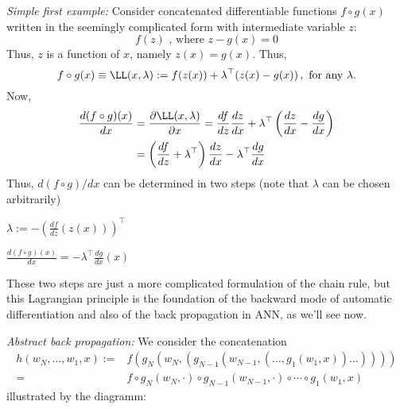 \emph{Simple first example:} Consider concatenated differentiable functions $f\circ g(x)$ written in the seemingly complicated form with intermediate variable $z$:
\[
f(z)\text{ , where }z-g(x)=0 
\]
Thus, $z$ is a function of $x$, namely $z(x)=g(x)$. Thus,
\[
f\circ g(x)\equiv\LL(x,\lambda):= f(z(x))+\lambda^\top(z(x)-g(x))\, ,
\text{ for any }\lambda.
\]
Now,
\begin{align*}
\frac{d(f\circ g)(x)}{dx}&=
\frac{\partial \LL(x,\lambda)}{\partial x}=
\frac{df}{dz}\frac{dz}{dx}+\lambda^\top\left(\frac{dz}{dx}-\frac{dg}{dx}\right)\\
&=\left(\frac{df}{dz}+\lambda^\top\right)\frac{dz}{dx}-\lambda^\top\frac{dg}{dx}
\end{align*}
Thus, $d(f\circ g)/dx$ can be determined in two steps (note that $\lambda$ can be chosen arbitrarily)
\ite
\item[(1)] $\lambda:=-\left(\frac{df}{dz}(z(x))\right)^\top$
\item[(2)] $\frac{d(f\circ g)(x)}{dx}=-\lambda^\top\frac{dg}{dx}(x)
$
\eti

These two steps are just a more complicated formulation of the chain rule, but this Lagrangian principle is the foundation of the backward mode of automatic differentiation and also of the back propagation in ANN, as we'll see now.

\emph{Abstract back propagation:}
We consider the concatenation
\begin{align*}
h(w_N,\ldots, w_1,x):=&f(g_N(w_N,(g_{N-1}(w_{N-1},(\ldots ,g_1(w_1,x))\ldots ))))\\
=&f\circ g_{N}(w_{N},\cdot)\circ g_{N-1}(w_{N-1},\cdot)\circ\cdots
\circ g_{1}(w_{1},x)
\end{align*}
illustrated by the diagramm:

\hspace{0.5cm}


